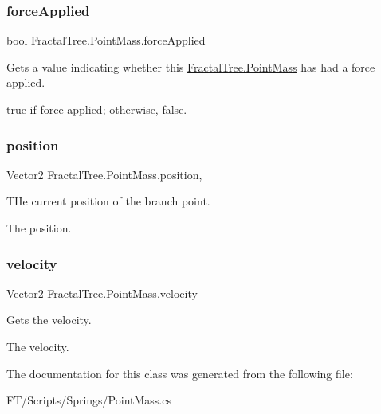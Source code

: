 \subsubsection{\texorpdfstring{force\+Applied}{forceApplied}}
{\footnotesize\ttfamily bool Fractal\+Tree.\+Point\+Mass.\+force\+Applied\hspace{0.3cm}{\ttfamily [get]}}



Gets a value indicating whether this \hyperlink{class_fractal_tree_1_1_point_mass}{Fractal\+Tree.\+Point\+Mass} has had a force applied. 

{\ttfamily true} if force applied; otherwise, {\ttfamily false}.\mbox{\label{class_fractal_tree_1_1_point_mass_a388c55b55d073a8962d8c4e61ce4fd94}} 
\subsubsection{\texorpdfstring{position}{position}}
{\footnotesize\ttfamily Vector2 Fractal\+Tree.\+Point\+Mass.\+position\hspace{0.3cm}{\ttfamily [get]}, {\ttfamily [set]}}



T\+He current position of the branch point. 

The position.\mbox{\label{class_fractal_tree_1_1_point_mass_a1cbd0cc0eacfadb549cbc5fdb87ccbb1}} 
\subsubsection{\texorpdfstring{velocity}{velocity}}
{\footnotesize\ttfamily Vector2 Fractal\+Tree.\+Point\+Mass.\+velocity\hspace{0.3cm}{\ttfamily [get]}}



Gets the velocity. 

The velocity.

The documentation for this class was generated from the following file\+:\begin{DoxyCompactItemize}
\item 
F\+T/\+Scripts/\+Springs/Point\+Mass.\+cs\end{DoxyCompactItemize}
